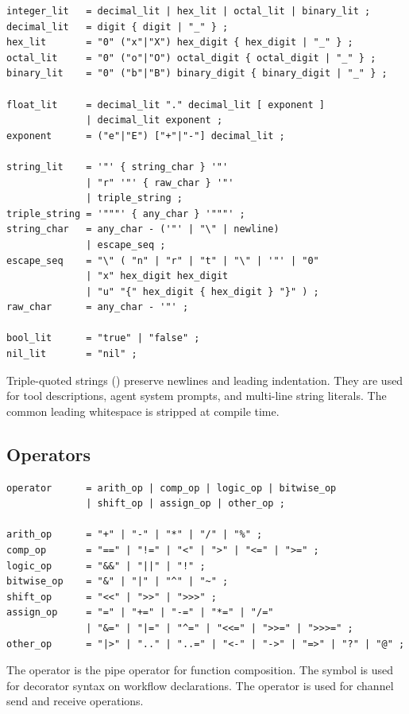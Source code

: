 \begin{lstlisting}[language=EBNF]
integer_lit   = decimal_lit | hex_lit | octal_lit | binary_lit ;
decimal_lit   = digit { digit | "_" } ;
hex_lit       = "0" ("x"|"X") hex_digit { hex_digit | "_" } ;
octal_lit     = "0" ("o"|"O") octal_digit { octal_digit | "_" } ;
binary_lit    = "0" ("b"|"B") binary_digit { binary_digit | "_" } ;

float_lit     = decimal_lit "." decimal_lit [ exponent ]
              | decimal_lit exponent ;
exponent      = ("e"|"E") ["+"|"-"] decimal_lit ;

string_lit    = '"' { string_char } '"'
              | "r" '"' { raw_char } '"'
              | triple_string ;
triple_string = '"""' { any_char } '"""' ;
string_char   = any_char - ('"' | "\" | newline)
              | escape_seq ;
escape_seq    = "\" ( "n" | "r" | "t" | "\" | '"' | "0"
              | "x" hex_digit hex_digit
              | "u" "{" hex_digit { hex_digit } "}" ) ;
raw_char      = any_char - '"' ;

bool_lit      = "true" | "false" ;
nil_lit       = "nil" ;
\end{lstlisting}

\begin{note}
Triple-quoted strings () preserve newlines and leading indentation. They are used for tool descriptions, agent system prompts, and multi-line string literals. The common leading whitespace is stripped at compile time.
\end{note}

\subsection{Operators}

\begin{lstlisting}[language=EBNF]
operator      = arith_op | comp_op | logic_op | bitwise_op
              | shift_op | assign_op | other_op ;

arith_op      = "+" | "-" | "*" | "/" | "%" ;
comp_op       = "==" | "!=" | "<" | ">" | "<=" | ">=" ;
logic_op      = "&&" | "||" | "!" ;
bitwise_op    = "&" | "|" | "^" | "~" ;
shift_op      = "<<" | ">>" | ">>>" ;
assign_op     = "=" | "+=" | "-=" | "*=" | "/="
              | "&=" | "|=" | "^=" | "<<=" | ">>=" | ">>>=" ;
other_op      = "|>" | ".." | "..=" | "<-" | "->" | "=>" | "?" | "@" ;
\end{lstlisting}

\begin{note}
The \code{|>} operator is the pipe operator for function composition. The  symbol is used for decorator syntax on workflow declarations. The \code{<-} operator is used for channel send and receive operations.
\end{note}

